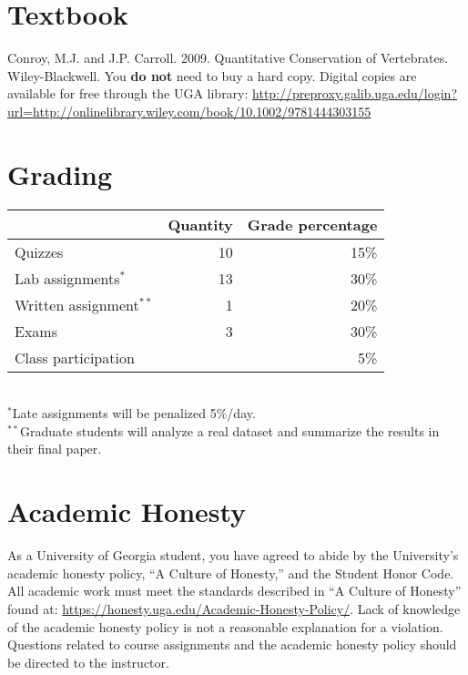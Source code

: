 \documentclass[11pt]{article}
\begin{document}
\vspace{-5mm}
\section*{Textbook}
\vspace{-5mm}
Conroy, M.J. and J.P. Carroll. 2009. Quantitative Conservation of
Vertebrates. Wiley-Blackwell. You {\bf do not} need to buy a hard
copy. Digital copies are available for free through the UGA library:
{\footnotesize \url{http://preproxy.galib.uga.edu/login?url=http://onlinelibrary.wiley.com/book/10.1002/9781444303155}}

\vspace{-5mm}
\section*{Grading}
\vspace{-5mm}
\begin{center}
  \begin{tabular}[h!]{lrr}
    \hline
                              & Quantity & Grade percentage  \\
    \hline
    Quizzes                   & 10       & 15\%              \\
    Lab assignments$^*$       & 13       & 30\%              \\
    Written assignment$^{**}$ & 1        & 20\%              \\
    Exams                     & 3        & 30\%              \\
    Class participation       &          & 5\%               \\
    \hline
  \end{tabular}                                              \\
  \small
\hspace{0mm} $^*$Late assignments will be penalized 5\%/day. \\
\hspace{0mm} $^{**}$Graduate students will analyze a real dataset and
summarize the results in their final paper. 
\end{center}



\vspace{-5mm}
\section*{Academic Honesty}
\vspace{-5mm}
As a University of Georgia student, you have agreed to abide by the
University's academic honesty policy, ``A Culture of Honesty,'' and
the Student Honor Code. All academic work must meet the standards
described in ``A Culture of Honesty'' found at:
\url{https://honesty.uga.edu/Academic-Honesty-Policy/}. Lack of
knowledge of the academic honesty policy is not a reasonable
explanation for a violation. Questions related to course assignments
and the academic honesty policy should be directed to the instructor.  
\end{document}
